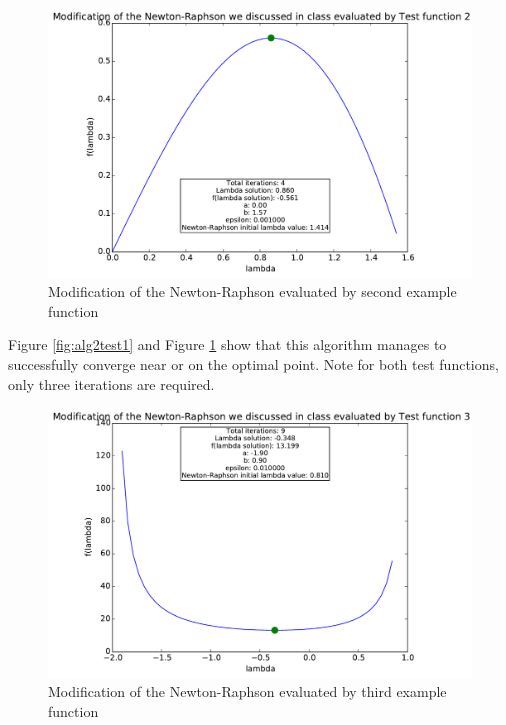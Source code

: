 \documentclass[a4paper,10pt]{article}
\begin{document}
\begin{figure}[h]
\centering
 \includegraphics[scale=0.55]{./graphs/algorithm2/x90percentofb/testFunction2.pdf} 
 \caption{Modification of the Newton-Raphson evaluated by second example function}
 \label{fig:alg2test2}
\end{figure}

Figure \ref{fig:alg2test1} and Figure \ref{fig:alg2test2} show that this algorithm manages to successfully converge near or on the optimal point. Note for both test functions, only three iterations are required.

\newpage
\begin{figure}[h]
\centering
 \includegraphics[scale=0.55]{./graphs/algorithm2/x90percentofb/testFunction3.pdf} 
 \caption{Modification of the Newton-Raphson evaluated by third example function}
 \label{fig:alg2test3}
\end{figure}
\end{document}

